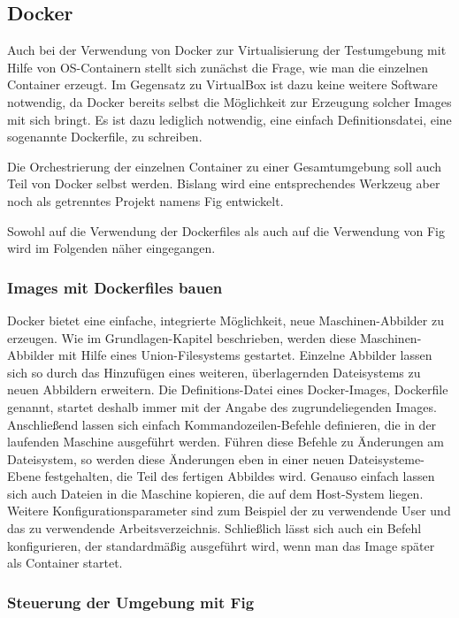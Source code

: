 \subsection{Docker}

Auch bei der Verwendung von Docker zur Virtualisierung der Testumgebung mit Hilfe von OS-Containern stellt sich zunächst die Frage, wie man die einzelnen Container erzeugt. Im Gegensatz zu VirtualBox ist dazu keine weitere Software notwendig, da Docker bereits selbst die Möglichkeit zur Erzeugung solcher Images mit sich bringt. Es ist dazu lediglich notwendig, eine einfach Definitionsdatei, eine sogenannte Dockerfile, zu schreiben.

Die Orchestrierung der einzelnen Container zu einer Gesamtumgebung soll auch Teil von Docker selbst werden. Bislang wird eine entsprechendes Werkzeug aber noch als getrenntes Projekt namens Fig entwickelt.

Sowohl auf die Verwendung der Dockerfiles als auch auf die Verwendung von Fig wird im Folgenden näher eingegangen.

\subsubsection{Images mit Dockerfiles bauen}

Docker bietet eine einfache, integrierte Möglichkeit, neue Maschinen-Abbilder zu erzeugen. Wie im Grundlagen-Kapitel beschrieben, werden diese Maschinen-Abbilder mit Hilfe eines Union-Filesystems gestartet. Einzelne Abbilder lassen sich so durch das Hinzufügen eines weiteren, überlagernden Dateisystems zu neuen Abbildern erweitern. Die Definitions-Datei eines Docker-Images, Dockerfile genannt, startet deshalb immer mit der Angabe des zugrundeliegenden Images. Anschließend lassen sich einfach Kommandozeilen-Befehle definieren, die in der laufenden Maschine ausgeführt werden. Führen diese Befehle zu Änderungen am Dateisystem, so werden diese Änderungen eben in einer neuen Dateisysteme-Ebene festgehalten, die Teil des fertigen Abbildes wird. Genauso einfach lassen sich auch Dateien in die Maschine kopieren, die auf dem Host-System liegen. Weitere Konfigurationsparameter sind zum Beispiel der zu verwendende User und das zu verwendende Arbeitsverzeichnis. Schließlich lässt sich auch ein Befehl konfigurieren, der standardmäßig ausgeführt wird, wenn man das Image später als Container startet.

\subsubsection{Steuerung der Umgebung mit Fig}
